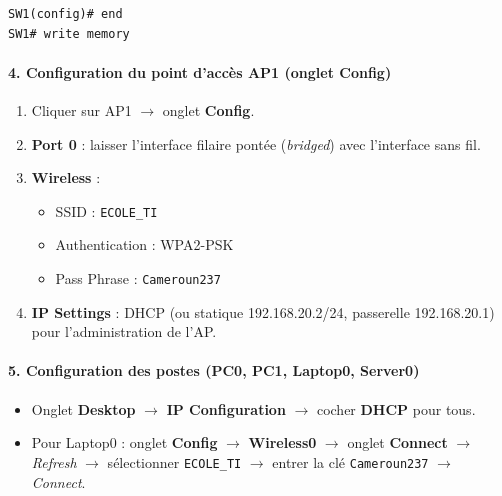 \documentclass[11pt]{article}
\begin{document}
\begin{exoresolu}
\begin{lstlisting}
SW1(config)# end
SW1# write memory
\end{lstlisting}

\paragraph{4. Configuration du point d'accès AP1 (onglet Config)}
\begin{enumerate}
    \item Cliquer sur AP1 $\rightarrow$ onglet \textbf{Config}.
    \item \textbf{Port 0} : laisser l'interface filaire pontée (\emph{bridged}) avec l'interface sans fil.
    \item \textbf{Wireless} :
    \begin{itemize}
        \item SSID : \texttt{ECOLE\_TI}
        \item Authentication : WPA2-PSK
        \item Pass Phrase : \texttt{Cameroun237}
    \end{itemize}
    \item \textbf{IP Settings} : DHCP (ou statique 192.168.20.2/24, passerelle 192.168.20.1) pour l'administration de l'AP.
\end{enumerate}

\paragraph{5. Configuration des postes (PC0, PC1, Laptop0, Server0)}
\begin{itemize}
    \item Onglet \textbf{Desktop} $\rightarrow$ \textbf{IP Configuration} $\rightarrow$ cocher \textbf{DHCP} pour tous.
    \item Pour Laptop0 : onglet \textbf{Config} $\rightarrow$ \textbf{Wireless0} $\rightarrow$ onglet \textbf{Connect} $\rightarrow$ \emph{Refresh} $\rightarrow$ sélectionner \texttt{ECOLE\_TI} $\rightarrow$ entrer la clé \texttt{Cameroun237} $\rightarrow$ \emph{Connect}.
\end{itemize}


\end{exoresolu}
\end{document}
